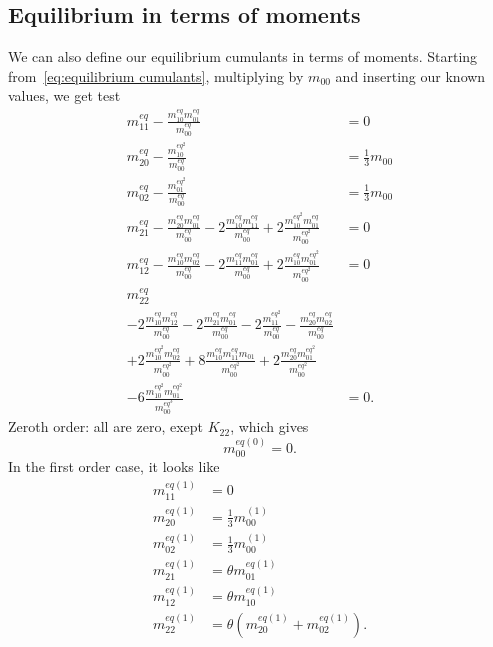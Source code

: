 \subsection{Equilibrium in terms of moments}
\label{sub:Equilibrium in terms of moments}
We can also define our equilibrium cumulants in terms of moments. Starting from~\eqref{eq:equilibrium cumulants}, multiplying by $m_{00}$ and inserting our known values, we get test
\begin{equation}
  \begin{aligned}
    m_{11}^{eq} - \frac{m_{10}^{eq}m_{01}^{eq}}{m_{00}^{eq}} & = 0 \\
    m_{20}^{eq} - \frac{m_{10}^{{eq}^2}}{m_{00}^{eq}} & = \frac{1}{3} m_{00} \\
    m_{02}^{eq} - \frac{m_{01}^{{eq}^2}}{m_{00}^{eq}} & = \frac{1}{3} m_{00} \\
    m_{21}^{eq} - \frac{m_{20}^{eq}m_{01}^{eq}}{m_{00}^{eq}} - 2\frac{m_{10}^{eq}m_{11}^{eq}} {m_{00}^{eq}} + 2\frac{m_{10}^{{eq}^2} m_{01}^{eq}}{m_{00}^{{eq}^2}} & = 0 \\
    m_{12}^{eq} - \frac{m_{10}^{eq}m_{02}^{eq}}{m_{00}^{eq}}
    - 2\frac{m_{11}^{eq}m_{01}^{eq}}{m_{00}^{eq}} + 2\frac{m_{10}^{eq} m_{01}^{{eq}^2}}{m_{00}^{{eq}^2}} & = 0 \\
    m_{22}^{eq} &\\
    - 2 \frac{m_{10}^{eq}m_{12}^{eq}}{m_{00}^{eq}} - 2\frac{m_{21}^{eq}m_{01}^{eq}}{m_{00}^{eq}}
    - 2 \frac{m_{11}^{{eq}^2}}{m_{00}^{eq}} - \frac{m_{20}^{eq}m_{02}^{eq}}{m_{00}^{eq}} &\\
    + 2 \frac{m_{10}^{{eq}^2} m_{02}^{eq}}{m_{00}^{{eq}^2}} + 8 \frac{m_{10}^{eq}m_{11}^{eq}m_{01}} {m_{00}^{{eq}^2}}
    + 2 \frac{m_{20}^{eq}m_{01}^{{eq}^2}}{m_{00}^{{eq}^2}} &\\
    - 6 \frac{m_{10}^{{eq}^2} m_{01}^{{eq}^2}}{m_{00}^{{eq}^3}} & = 0.
  \end{aligned}
\end{equation}
Zeroth order: all are zero, exept $K_{22}$, which gives
\begin{equation}
  m_{00}^{eq(0)} = 0.
\end{equation}
In the first order case, it looks like
\begin{equation}
  \begin{aligned}
    m_{11}^{eq(1)} & = 0 \\
    m_{20}^{eq(1)} & = \frac{1}{3} m_{00}^{(1)} \\
    m_{02}^{eq(1)} & = \frac{1}{3} m_{00}^{(1)}  \\
    m_{21}^{eq(1)} & = \theta m_{01}^{eq(1)} \\
    m_{12}^{eq(1)} & = \theta m_{10}^{eq(1)} \\
    m_{22}^{eq(1)} & = \theta (m_{20}^{eq(1)} + m_{02}^{eq(1)}).
  \end{aligned}
\end{equation}
